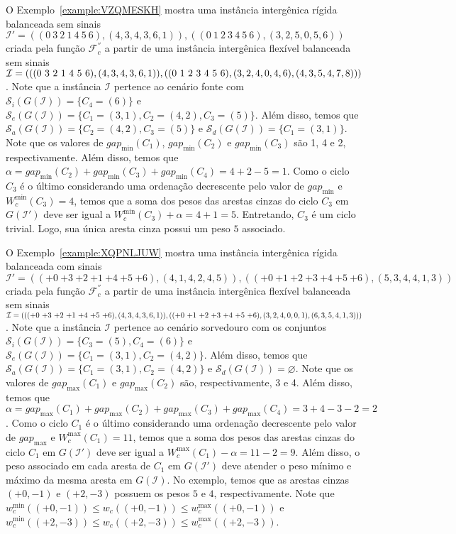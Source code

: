 O Exemplo~\ref{example:VZQMESKH} mostra uma instância intergênica rígida balanceada sem sinais $\mathcal{I}' = ((0~3~2~1~4~5~6),(4,3,4,3,6,1)),((0~1~2~3~4~5~6),(3,2,5,0,5,6))$ criada pela função $\mathcal{F}_{c}^{''}$ a partir de uma instância intergênica flexível balanceada sem sinais $\mathcal{I} = (((0~3~2~1~4~5~6),(4,3,4,\break3,6,1)),((0~1~2~3~4~5~6),(3,2,4,0,4,6),(4,3,5,4,7,8)))$. Note que a instância $\mathcal{I}$ pertence ao cenário fonte com $\mathcal{S}_i(G(\mathcal{I})) = \{C_4=(6)\}$ e $\mathcal{S}_e(G(\mathcal{I})) = \{C_1=(3,1),C_2=(4,2),C_3=(5)\}$. Além disso, temos que $\mathcal{S}_a(G(\mathcal{I})) = \{C_2=(4,2),C_3=(5)\}$ e $\mathcal{S}_d(G(\mathcal{I})) = \{C_1=(3,1)\}$. Note que os valores de $gap_{\min}(C_1)$, $gap_{\min}(C_2)$ e $gap_{\min}(C_3)$ são 1, 4 e 2, respectivamente. Além disso, temos que $\alpha = gap_{\min}(C_2) + gap_{\min}(C_3) + gap_{\min}(C_4) = 4 + 2 - 5 = 1$. Como o ciclo $C_3$ é o último considerando uma ordenação decrescente pelo valor de $gap_{\min}$ e $W^{\min}_c(C_3) = 4$, temos que a soma dos pesos das arestas cinzas do ciclo $C_3$ em $G(\mathcal{I}')$ deve ser igual a $W^{\min}_c(C_3) + \alpha = 4 + 1 = 5$. Entretando, $C_3$ é um ciclo trivial. Logo, sua única aresta cinza possui um peso $5$ associado.



O Exemplo~\ref{example:XQPNLJUW} mostra uma instância intergênica rígida balanceada com sinais $\mathcal{I}' = (({+0}~{+3}~{+2}~{+1}~{+4}~{+5}~{+6}),(4,1,4,2,4,5)),(({+0}~{+1}~{+2}~{+3}~{+4}~{+5}~{+6}),(5,3,4,4,1,3))$ criada pela função $\mathcal{F}_{c}^{''}$ a partir de uma instância intergênica flexível balanceada sem sinais $\mathcal{I} = ((({+0}~{+3}~{+2}~{+1}~{+4}~{+5}~{+6}),(4,3,4,3,6,1)),(({+0}~{+1}~{+2}~{+3}~{+4}~{+5}~{+6}),(3,2,4,0,0,\break1),(6,3,5,4,1,3)))$. Note que a instância $\mathcal{I}$ pertence ao cenário sorvedouro com os conjuntos $\mathcal{S}_i(G(\mathcal{I})) = \{C_3=(5),C_4=(6)\}$ e $\mathcal{S}_e(G(\mathcal{I})) = \{C_1=(3,1),C_2=(4,2)\}$. Além disso, temos que $\mathcal{S}_a(G(\mathcal{I})) = \{C_1=(3,1),C_2=(4,2)\}$ e $\mathcal{S}_d(G(\mathcal{I})) = \varnothing$. Note que os valores de $gap_{\max}(C_1)$ e $gap_{\max}(C_2)$ são, respectivamente, 3 e 4. Além disso, temos que $\alpha = gap_{\max}(C_1) + gap_{\max}(C_2) + gap_{\max}(C_3) + gap_{\max}(C_4) = 3 + 4 - 3 - 2 = 2$. Como o ciclo $C_1$ é o último considerando uma ordenação decrescente pelo valor de $gap_{\max}$ e $W^{\max}_c(C_1) = 11$, temos que a soma dos pesos das arestas cinzas do ciclo $C_1$ em $G(\mathcal{I}')$ deve ser igual a $W^{\max}_c(C_1) - \alpha = 11 - 2 = 9$. Além disso, o peso associado em cada aresta de $C_1$ em $G(\mathcal{I}')$ deve atender o peso mínimo e máximo da mesma aresta em $G(\mathcal{I})$. No exemplo, temos que as arestas cinzas $({+0},{-1})$ e $({+2},{-3})$ possuem os pesos $5$ e $4$, respectivamente. Note que $w^{\min}_c(({+0},{-1})) \le w_c(({+0},{-1})) \le w^{\max}_c(({+0},{-1}))$ e $w^{\min}_c(({+2},{-3})) \le w_c(({+2},{-3})) \le w^{\max}_c(({+2},{-3}))$.


